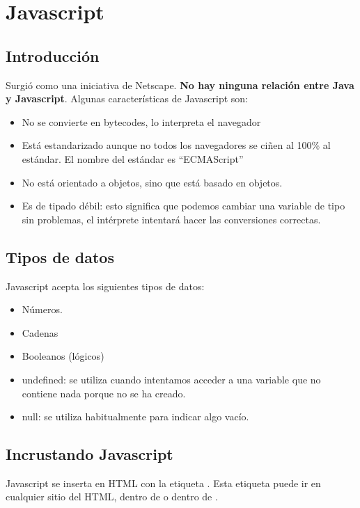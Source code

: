 \documentclass[letterpaper,10pt,spanish]{sphinxmanual}
\begin{document}
\chapter{Javascript}
\label{tema4::doc}\label{tema4:javascript}

\section{Introducción}
\label{tema4:introduccion}
Surgió como una iniciativa de Netscape. \textbf{No hay ninguna relación entre Java y Javascript}. Algunas características de Javascript son:
\begin{itemize}
\item {} 
No se convierte en bytecodes, lo interpreta el navegador

\item {} 
Está estandarizado aunque no todos los navegadores se ciñen al 100\% al estándar. El nombre del estándar es ``ECMAScript''

\item {} 
No está orientado a objetos, sino que está basado en objetos.

\item {} 
Es de tipado débil: esto significa que podemos cambiar una variable de tipo sin problemas, el intérprete intentará hacer las conversiones correctas.

\end{itemize}


\section{Tipos de datos}
\label{tema4:tipos-de-datos}
Javascript acepta los siguientes tipos de datos:
\begin{itemize}
\item {} 
Números.

\item {} 
Cadenas

\item {} 
Booleanos (lógicos)

\item {} 
undefined: se utiliza cuando intentamos acceder a una variable que no contiene nada porque no se ha creado.

\item {} 
null: se utiliza habitualmente para indicar algo vacío.

\end{itemize}


\section{Incrustando Javascript}
\label{tema4:incrustando-javascript}
Javascript se inserta en HTML con la etiqueta . Esta etiqueta puede ir en cualquier sitio del HTML, dentro de  o dentro de .
\end{document}
